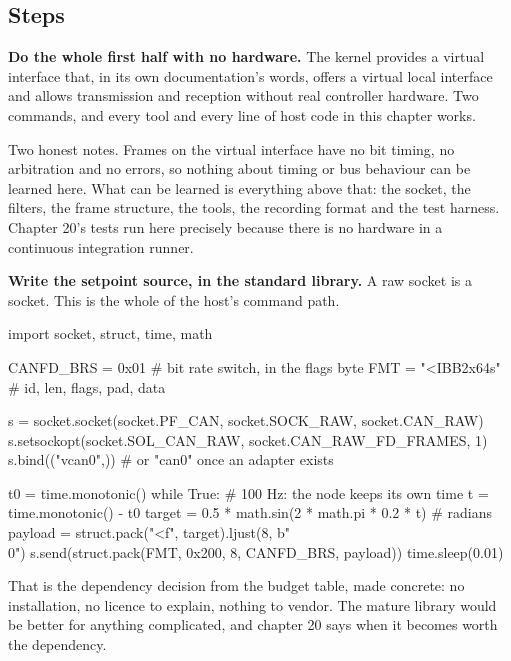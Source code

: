 \subsection*{Steps}

\begin{steps}
\item \textbf{Do the whole first half with no hardware.} The kernel provides a
virtual interface that, in its own documentation's words, offers a virtual local
interface and allows transmission and reception without real controller
hardware. Two commands, and every tool and every line of host code in this
chapter works.
Two honest notes. Frames on the virtual interface have no bit timing, no
arbitration and no errors, so nothing about timing or bus behaviour can be
learned here. What can be learned is everything above that: the socket, the
filters, the frame structure, the tools, the recording format and the test
harness. Chapter 20's tests run here precisely because there is no hardware in
a continuous integration runner.

\item \textbf{Write the setpoint source, in the standard library.} A raw socket
is a socket. This is the whole of the host's command path.
\begin{pycode}
import socket, struct, time, math

CANFD_BRS = 0x01                      # bit rate switch, in the flags byte
FMT = "<IBB2x64s"                     # id, len, flags, pad, data

s = socket.socket(socket.PF_CAN, socket.SOCK_RAW, socket.CAN_RAW)
s.setsockopt(socket.SOL_CAN_RAW, socket.CAN_RAW_FD_FRAMES, 1)
s.bind(("vcan0",))                    # or "can0" once an adapter exists

t0 = time.monotonic()
while True:                           # 100 Hz: the node keeps its own time
    t = time.monotonic() - t0
    target = 0.5 * math.sin(2 * math.pi * 0.2 * t)     # radians
    payload = struct.pack("<f", target).ljust(8, b"\\0")
    s.send(struct.pack(FMT, 0x200, 8, CANFD_BRS, payload))
    time.sleep(0.01)
\end{pycode}
That is the dependency decision from the budget table, made concrete: no
installation, no licence to explain, nothing to vendor. The mature library would
be better for anything complicated, and chapter 20 says when it becomes worth
the dependency.


\end{steps}
